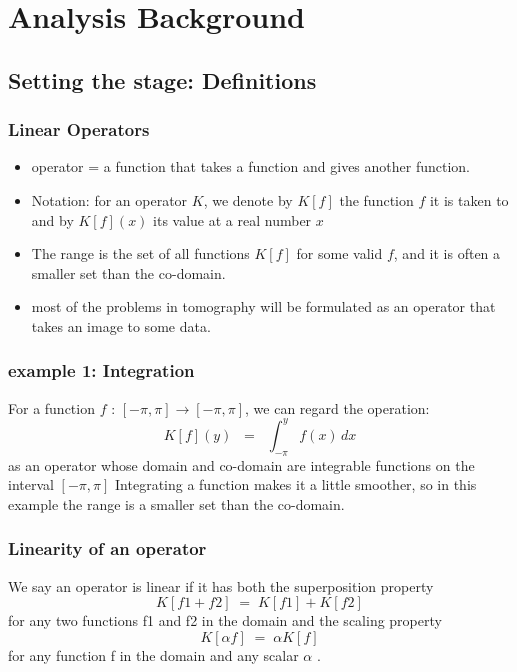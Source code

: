 \documentclass{beamer}
\begin{document}
\section{Analysis Background}
\subsection{Setting the stage: Definitions}
\begin{frame}
	\frametitle{Linear Operators}
	\begin{itemize}
		\item operator = a function that takes a function and gives another function.
		 \pause
		\item Notation: for an operator $K$, we denote by $K[f]$ the function $f$ it is taken
			to and by $K[f](x)$ its value at a real number $x$
		 \pause
		\item The range is the set of all functions $K[f]$ for some valid $f$, and it is often a smaller set than the co-domain.
		 \pause
		\item most of the problems in tomography will be formulated as an operator that takes an image to some data.

	\end{itemize}
\end{frame}

\begin{frame}
	\frametitle{example 1: Integration}
	For a function $f$ : $[-\pi, \pi] \rightarrow [-\pi,\pi]$, we can regard the operation: 
	$$ K[f](y) \; \; = \; \; \int_{-\pi}^{y} f(x) \,dx$$
	as an operator whose domain and co-domain are integrable functions on the interval $[-\pi, \pi] $ 
	\newline 
	Integrating a function makes it a little smoother, so in this example the range is a smaller set than the co-domain.
\end{frame}
\begin{frame}
	\frametitle{Linearity of an operator}
	We say an operator is linear if it has both the superposition property 
	$$  K[f1 + f2] \; = \; K[f1] + K[f2]$$ 
	for any two functions f1 and f2 in the domain and the scaling property 
	$$ K[\alpha f] \; = \; \alpha K[f]$$
	for any function f in the domain and any scalar $\alpha$ .

\end{frame}
\end{document}
